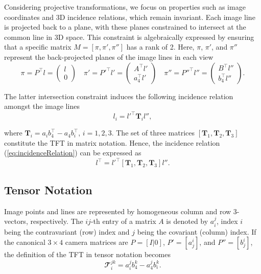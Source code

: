 Considering projective transformations, we focus on properties such as image coordinates and 3D incidence relations, which remain invariant. Each image line is projected back to a plane, with these planes constrained to intersect at the common line in 3D space. This constraint is algebraically expressed by ensuring that a specific matrix \( M = [\pi, \pi', \pi''] \) has a rank of 2. Here, \( \pi \), \( \pi' \), and \( \pi'' \) represent the back-projected planes of the image lines in each view
\begin{equation}
	\pi = P^\top l = \left( \begin{array}{c} l \\ 0 \end{array} \right) \quad
	\pi' = P'^\top l' = \left( \begin{array}{c} A^\top l' \\ a_4^\top l' \end{array} \right) \quad
	\pi'' = P''^\top l'' = \left( \begin{array}{c} B^\top l'' \\ b_4^\top l'' \end{array} \right).
\end{equation}

The latter intersection constraint induces the following incidence relation amongst the image lines
\begin{equation}
	l_i = l'^\top \bm{T}_il'',
	\label{eq:incidenceRelation}
\end{equation}

where \( \bm{T}_i = a_ib_4^\top - a_4b_i^\top \), \( i = 1, 2, 3 \). The set of three matrices \( [\bm{T}_1, \bm{T}_2, \bm{T}_3] \) constitute the \ac{TFT} in matrix notation. Hence, the incidence relation (\ref{eq:incidenceRelation}) can be expressed as
\begin{equation}
	l^\top = l'^\top [\bm{T}_1, \bm{T}_2, \bm{T}_3] l''.
	\label{eq:incidenceRelationMatrix}
\end{equation}

\subsection{Tensor Notation}
Image points and lines are represented by homogeneous column and row 3-vectors, respectively. The \( ij \)-th entry of a matrix \( A \) is denoted by \( a_i^j \), index \( i \) being the contravariant (row) index and \( j \) being the covariant (column) index. If the canonical \( 3 \times 4 \) camera matrices are \( P = [I|0] \), \( P' = [a_j^i] \), and \( P'' = [b_j^i] \), the definition of the \acs{TFT} in tensor notation becomes
\begin{equation}
	\mathbfcal{T}_i^{jk} = a_i^jb_4^k - a_4^jb_i^k.
	\label{eq:tensorDef}
\end{equation}

